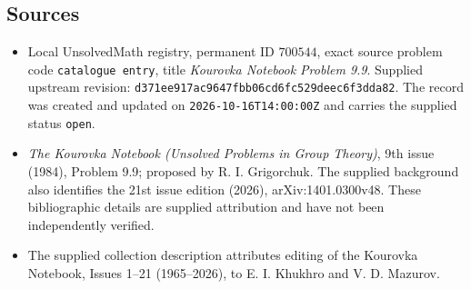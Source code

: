 \documentclass[11pt]{article}
\begin{document}
\subsection{Sources}
\begin{itemize}
\item Local UnsolvedMath registry, permanent ID \(700544\), exact source problem code \texttt{catalogue entry}, title \emph{Kourovka Notebook Problem 9.9}. Supplied upstream revision: \texttt{d371ee917ac9647fbb06cd6fc529deec6f3dda82}. The record was created and updated on \texttt{2026-10-16T14:00:00Z} and carries the supplied status \texttt{open}.
\item \emph{The Kourovka Notebook (Unsolved Problems in Group Theory)}, 9th issue (1984), Problem 9.9; proposed by R. I. Grigorchuk. The supplied background also identifies the 21st issue edition (2026), arXiv:1401.0300v48. These bibliographic details are supplied attribution and have not been independently verified.
\item The supplied collection description attributes editing of the Kourovka Notebook, Issues 1--21 (1965--2026), to E. I. Khukhro and V. D. Mazurov.
\end{itemize}
\end{document}
